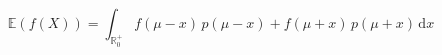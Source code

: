 \documentclass[preview]{standalone}
\begin{document}
\begin{equation}
\tag{19}
    \mathbb{E} ( f ( X ) ) = \int_{\mathbb{R}^+_0} f ( \mu - x ) \, p ( \mu - x ) + f ( \mu + x ) \, p ( \mu + x ) \, \mathrm{d}x
\end{equation}
\end{document}
